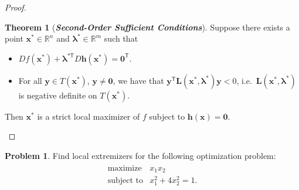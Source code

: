 \documentclass[12pt]{article}
\theoremstyle{definition}
\newtheorem{problem}{Problem}
\newcommand{\vc}[1]{\boldsymbol{#1}}
\newcommand{\tran}{\mathsf{T}}
\newtheorem{theorem}{Theorem}
\begin{document}
\begin{proof}
\begin{enumerate}
\begin{theorem}[\emph{\textbf{Second-Order Sufficient Conditions}}]
        Suppose there exists a point $\vc{x}^* \in \mathbb{R}^n$ and $\vc{\lambda^*} \in \mathbb{R}^m$ such that
        \begin{itemize}
          \item $D f(\vc{x}^*) + \vc{\lambda}^{*\tran} D \vc{h}(\vc{x}^*) = \vc{0}^\tran$.
          \item For all $\vc{y}\in T(\vc{x}^*)$, $\vc{y}\neq \vc{0}$, we have that $\vc{y}^\tran \vc{L}(\vc{x}^*, \vc{\lambda}^{*})\vc{y} < 0$, i.e.\ $\vc{L}(\vc{x}^*, \vc{\lambda}^{*})$ is negative definite on $T(\vc{x}^*)$.
        \end{itemize}
        Then $\vc{x}^*$ is a strict local maximizer of $f$ subject to $\vc{h}(\vc{x}) = \vc{0}.$
      \end{theorem}
  \end{enumerate}
\end{proof}
\newpage


\begin{problem}
  Find local extremizers for the following optimization problem:
  \begin{align*}
    \begin{array}{rl}
      \text{maximize} & x_1x_2 \\
      \text{subject to} & x_1^2 + 4x_2^2 = 1.
    \end{array}
  \end{align*}
\end{problem}
\end{document}
